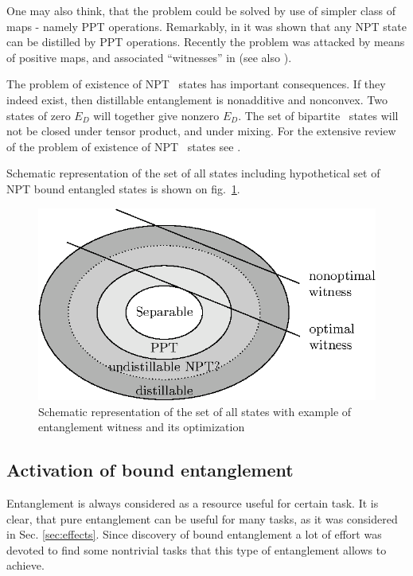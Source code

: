 \documentclass[twocolumn,aps,rmp]{revtex4}
\begin{document}
One may also think, that the problem could be solved by use of simpler
class of maps - namely PPT operations. Remarkably, in \cite{WernerPPT}
it was shown that any NPT state can be distilled by PPT operations.
Recently the problem was attacked by means of positive maps, and
associated ``witnesses'' in \cite{Clarisse2004-distil-maps} (see also
\cite{Clarisse2005-distil}).

The problem of existence of NPT \bent\ states has important
consequences. If they indeed exist, then distillable entanglement is
nonadditive and nonconvex. Two states of zero $E_D$ will together give
nonzero $E_D$. The set of bipartite \bent\ states will not be closed
under tensor product, and under mixing. For the extensive review of
the problem of existence of NPT \bent\ states see \cite{ClarissePhd}.

Schematic representation of the set of all states including
hypothetical set of NPT bound entangled states is shown on
fig.~\ref{fig:states-and-witnesses}.

\begin{figure}
  \centering
  \includegraphics{fig-states-and-witnesses}
  \caption{Schematic representation of the set of all states with
    example of entanglement witness and its optimization}
  \label{fig:states-and-witnesses}
\end{figure}

\subsection{Activation of bound entanglement}
\label{subsec:activbound}
Entanglement is always considered as a resource useful for certain
task. It is clear, that pure entanglement can be useful for many
tasks, as it was considered in Sec. \ref{sec:effects}. Since
discovery of bound entanglement a lot of effort was devoted to find
some nontrivial tasks that this type of entanglement
allows to achieve.
\end{document}
